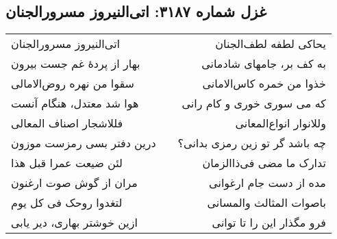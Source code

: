 \begin{center}
\section*{غزل شماره ۳۱۸۷: اتی‌النیروز مسرورالجنان}
\label{sec:3187}
\begin{longtable}{l p{0.5cm} r}
اتی‌النیروز مسرورالجنان
&&
یحاکی لطفه لطف‌الجنان
\\
بهار از پردهٔ غم جست بیرون
&&
به کف بر، جامهای شادمانی
\\
سقوا من نهره روض‌الامالی
&&
خذوا من خمره کاس‌الامانی
\\
هوا شد معتدل، هنگام آنست
&&
که می سوری خوری و کام رانی
\\
فللاشجار اصناف المعالی
&&
وللانوار انواع‌المعانی
\\
درین دفتر بسی رمزست موزون
&&
چه باشد گر تو زین رمزی بدانی؟
\\
لئن ضیعت عمرا قبل هذا
&&
تدارک ما مضی فی‌ذاالزمان
\\
مران از گوش صوت ارغنون
&&
مده از دست جام ارغوانی
\\
لتغدوا روحک فی کل یوم
&&
باصوات المثالث والمسانی
\\
ازین خوشتر بهاری، دیر یابی
&&
فرو مگذار این را تا توانی
\\
\end{longtable}
\end{center}
